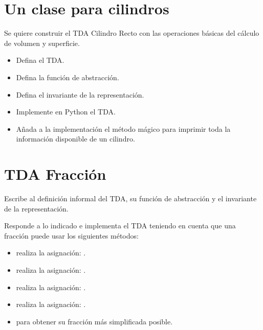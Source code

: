





%



\separacion
\section{Un clase para cilindros} \label{sec:TDACilindro}

Se quiere construir el TDA Cilindro Recto con las operaciones básicas del cálculo de volumen y superficie.
\begin{itemize}
\item Defina el TDA.
\item Defina la función de abstracción.
\item Defina el invariante de la representación.
\item Implemente en Python el TDA.
\item Añada a la implementación el método mágico  para imprimir toda la información disponible de un cilindro.
\end{itemize}


 
\separacion
\section{TDA Fracción} \label{sec:TDAFraccion}

Escribe al definición informal del TDA, su función de abstracción y el invariante de la representación.

Responde a lo indicado e implementa el TDA teniendo en cuenta que una fracción  puede usar los siguientes métodos: 
\begin{itemize}
\item {} realiza la asignación: . 
\item {} realiza la asignación: . 
\item {} realiza la asignación: . 
\item {} realiza la asignación: .
\item {} para obtener su fracción más simplificada posible.
\end{itemize}

